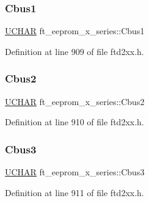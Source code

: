 \subsubsection{\texorpdfstring{Cbus1}{Cbus1}}
{\footnotesize\ttfamily \hyperlink{CatCaloProto40MHz_2inc_2WinTypes_8h_a4f4bb67531a9bf6f0b9c6ad76aeba587}{U\+C\+H\+AR} ft\+\_\+eeprom\+\_\+x\+\_\+series\+::\+Cbus1}



Definition at line 909 of file ftd2xx.\+h.

\mbox{\label{structft__eeprom__x__series_a534b7e3869bd969bb2fe23cf3e2ffee5}} 
\subsubsection{\texorpdfstring{Cbus2}{Cbus2}}
{\footnotesize\ttfamily \hyperlink{CatCaloProto40MHz_2inc_2WinTypes_8h_a4f4bb67531a9bf6f0b9c6ad76aeba587}{U\+C\+H\+AR} ft\+\_\+eeprom\+\_\+x\+\_\+series\+::\+Cbus2}



Definition at line 910 of file ftd2xx.\+h.

\mbox{\label{structft__eeprom__x__series_a3067e895366665eb69c189f388944d4d}} 
\subsubsection{\texorpdfstring{Cbus3}{Cbus3}}
{\footnotesize\ttfamily \hyperlink{CatCaloProto40MHz_2inc_2WinTypes_8h_a4f4bb67531a9bf6f0b9c6ad76aeba587}{U\+C\+H\+AR} ft\+\_\+eeprom\+\_\+x\+\_\+series\+::\+Cbus3}



Definition at line 911 of file ftd2xx.\+h.

\mbox{\label{structft__eeprom__x__series_aeda7e4f92d1303d6fd0d9b79c055abd7}} 
